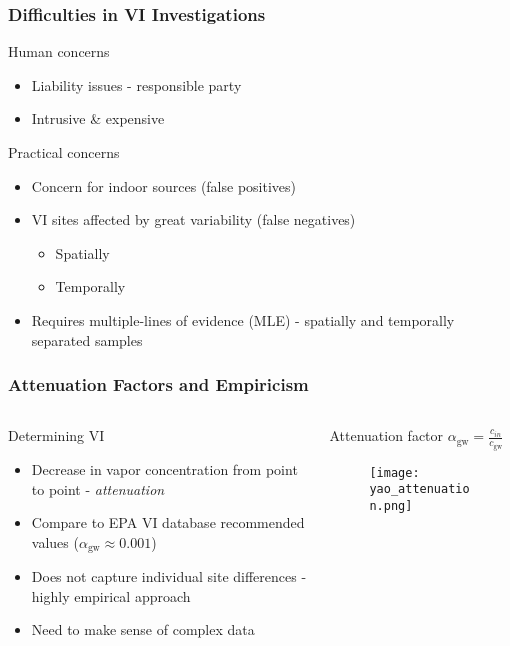 \begin{frame}
  \frametitle{Difficulties in VI Investigations}
  \begin{block}{Human concerns}
    \begin{itemize}
      \item Liability issues - responsible party
      \item Intrusive \& expensive
    \end{itemize}
  \end{block}
  \begin{block}{Practical concerns}
    \begin{itemize}
      \item Concern for indoor sources (false positives)
      \item VI sites affected by great variability (false negatives)
      \begin{itemize}
        \item Spatially
        \item Temporally
      \end{itemize}
      \item Requires multiple-lines of evidence (MLE) - spatially and temporally separated samples
    \end{itemize}
  \end{block}
\end{frame}


\begin{frame}
  \frametitle{Attenuation Factors and Empiricism}

\begin{columns}[T]
  \begin{column}{0.5\textwidth}
    \begin{block}{Determining VI}
      \begin{itemize}
        \item Decrease in vapor concentration from point to point - \textit{attenuation}
        \item Compare to EPA VI database recommended values ($\alpha_\mathrm{gw} \approx 0.001$)
        \item Does not capture individual site differences - highly empirical approach
        \item Need to make sense of complex data
      \end{itemize}
    \end{block}
  \end{column}

  \begin{column}{0.5\textwidth}
    \begin{block}{Attenuation factor}
      \centering
      $\alpha_\mathrm{gw} = \frac{c_{in}}{c_\mathrm{gw}}$\\
      \begin{figure}
        \texttt{[image: yao\_attenuation.png]}
        \caption{\tiny{\citeauthor{yao_examination_2013-1}\cite{yao_examination_2013-1}}}
      \end{figure}
    \end{block}
  \end{column}
\end{columns}
\end{frame}

